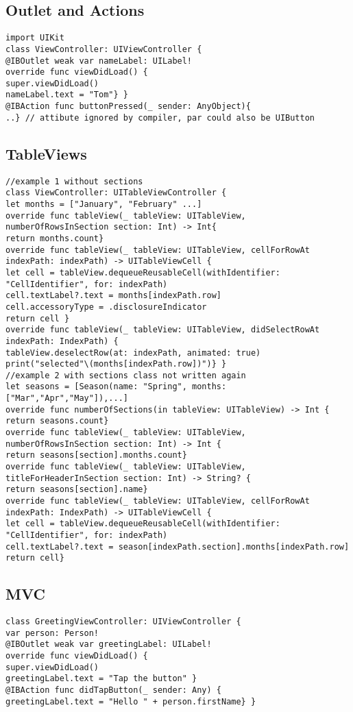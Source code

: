 \subsection{Outlet and Actions}
\begin{lstlisting}
import UIKit
class ViewController: UIViewController {
@IBOutlet weak var nameLabel: UILabel!
override func viewDidLoad() {
super.viewDidLoad()
nameLabel.text = "Tom"} }
@IBAction func buttonPressed(_ sender: AnyObject){
..} // attibute ignored by compiler, par could also be UIButton
\end{lstlisting}

\subsection{TableViews}
\begin{lstlisting}
//example 1 without sections
class ViewController: UITableViewController {
let months = ["January", "February" ...]
override func tableView(_ tableView: UITableView, numberOfRowsInSection section: Int) -> Int{
return months.count}
override func tableView(_ tableView: UITableView, cellForRowAt indexPath: indexPath) -> UITableViewCell {
let cell = tableView.dequeueReusableCell(withIdentifier: "CellIdentifier", for: indexPath)
cell.textLabel?.text = months[indexPath.row]
cell.accessoryType = .disclosureIndicator
return cell }
override func tableView(_ tableView: UITableView, didSelectRowAt indexPath: IndexPath) {
tableView.deselectRow(at: indexPath, animated: true)
print("selected"\(months[indexPath.row])")} }
//example 2 with sections class not written again
let seasons = [Season(name: "Spring", months: ["Mar","Apr","May"]),...]
override func numberOfSections(in tableView: UITableView) -> Int { return seasons.count}
override func tableView(_ tableView: UITableView, numberOfRowsInSection section: Int) -> Int {
return seasons[section].months.count}
override func tableView(_ tableView: UITableView, titleForHeaderInSection section: Int) -> String? {
return seasons[section].name}
override func tableView(_ tableView: UITableView, cellForRowAt indexPath: IndexPath) -> UITableViewCell {
let cell = tableView.dequeueReusableCell(withIdentifier: "CellIdentifier", for: indexPath)
cell.textLabel?.text = season[indexPath.section].months[indexPath.row]
return cell}
\end{lstlisting}

\subsection{MVC}
\begin{lstlisting}
class GreetingViewController: UIViewController {
var person: Person!
@IBOutlet weak var greetingLabel: UILabel!
override func viewDidLoad() {
super.viewDidLoad()
greetingLabel.text = "Tap the button" }
@IBAction func didTapButton(_ sender: Any) {
greetingLabel.text = "Hello " + person.firstName} }
\end{lstlisting}

